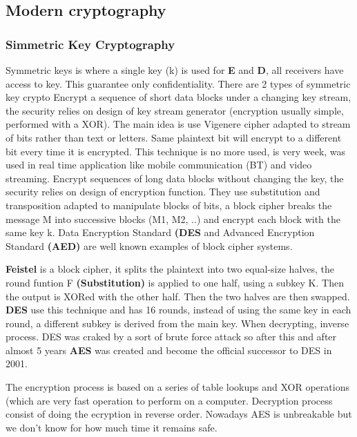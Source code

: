     \subsection{Modern cryptography}
    \subsubsection{Simmetric Key Cryptography}
    Symmetric keys is where a single key (k) is used for \textbf{E} and \textbf{D}, all receivers have access to key. This guarantee only confidentiality. There are 2 types of symmetric key crypto
    Encrypt a sequence of short data blocks under a changing key stream, the security relies on design of key stream generator (encryption usually simple, performed with a XOR). The main idea is use Vigenere cipher adapted to stream of bits rather than text or letters. Same plaintext bit will encrypt to a different bit every time it is encrypted. This technique is no more used, is very week, was used in real time application like mobile communication (BT) and video streaming.
    Encrypt sequences of long data blocks without changing the key, the security relies on design of encryption function. They use substitution and transposition adapted to manipulate blocks of bits, a block cipher breaks the message M into successive blocks (M1, M2, ..) and encrypt each block with the same key k. Data Encryption Standard \textbf{(DES} and Advanced Encryption Standard \textbf{(AED)} are well known examples of block cipher systems.
    
    \textbf{Feistel} is a block cipher, it splits the plaintext into two equal-size halves, the round funtion F \textbf{(Substitution)} is applied to one half, using a subkey K. Then the output is XORed with the other half. Then the two halves are then swapped. \textbf{DES} use this technique and has 16 rounds, instead of using the same key in each round, a different subkey is derived from the main key. When decrypting, inverse process. DES was craked by a sort of brute force attack so after this and after almost 5 years \textbf{AES} was created and become the official successor to DES in 2001.
    
    The encryption process is based on a series of table lookups and XOR operations (which are very fast operation to perform on a computer. Decryption process consist of doing the ecryption in reverse order. Nowadays AES is unbreakable but we don't know for how much time it remains safe.
    
